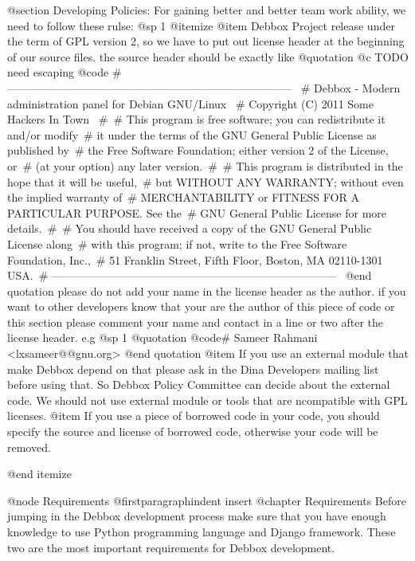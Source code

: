@section Developing Policies:
For gaining better and better team work ability, we need to follow these rulse:
@sp 1
@itemize
@item
Debbox Project release under the term of GPL version 2, so we have to put out license
header at the beginning of our source files. the source header should be exactly like
@quotation
@c TODO need escaping
@code{
# ----------------------------------------------------------------------------- \
#    Debbox - Modern administration panel for Debian GNU/Linux \
#    Copyright (C) 2011 Some Hackers In Town \
#\
#    This program is free software; you can redistribute it and/or modify\
#    it under the terms of the GNU General Public License as published by\
#    the Free Software Foundation; either version 2 of the License, or\
#    (at your option) any later version.\
#\
#    This program is distributed in the hope that it will be useful,\
#    but WITHOUT ANY WARRANTY; without even the implied warranty of\
#    MERCHANTABILITY or FITNESS FOR A PARTICULAR PURPOSE.  See the\
#    GNU General Public License for more details.\
#\
#    You should have received a copy of the GNU General Public License along\
#    with this program; if not, write to the Free Software Foundation, Inc.,\
#    51 Franklin Street, Fifth Floor, Boston, MA 02110-1301 USA.\
# -----------------------------------------------------------------------------\
}
@end quotation
please do not add your name in the license header as the author. if you want to other developers know that your are
the author of this piece of code or this section please comment your name and contact in a line or two after the license header. 
e.g
@sp 1
@quotation
@code{# Sameer Rahmani <lxsameer@@gnu.org>}
@end quotation
@item
If you use an external module that make Debbox depend on that please ask in the Dina Developers mailing list before using that.
So Debbox Policy Committee can decide about the external code. We should not use external module or tools that are ncompatible with  GPL licenses.
@item
If you use a piece of borrowed code in your code, you should specify the source and license of borrowed code, otherwise your code will be removed. 

@end itemize




@node Requirements
@firstparagraphindent insert
@chapter Requirements
Before jumping in the Debbox development process make sure that you have enough knowledge to use
Python programming language and Django framework. These two are the most important requirements
for Debbox development.

